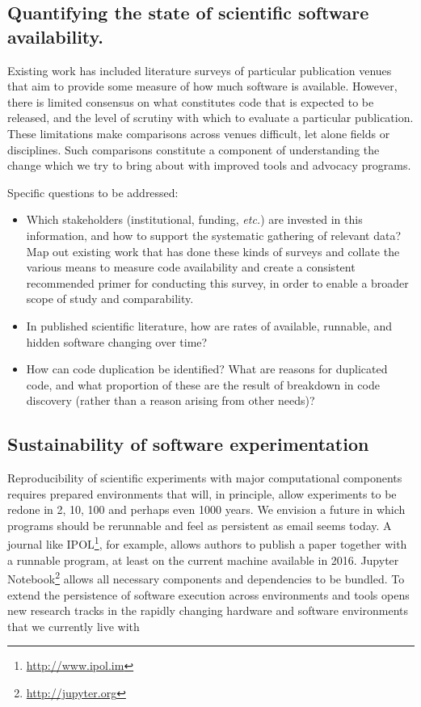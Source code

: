 \documentclass[a4paper,UKenglish]{dagman}
\newcommand{\etc}{\emph{etc.}\xspace}
\begin{document}

\subsection{Quantifying the state of scientific software availability.}

Existing work has included literature surveys of particular publication venues  that aim to provide some measure of how much software is available. However, there is limited consensus on what constitutes code that is expected to be released, and the level of scrutiny with which to evaluate a particular publication. These limitations make comparisons across venues difficult, let alone fields or disciplines. Such comparisons constitute a component of understanding the change which we try to bring about with improved tools and advocacy programs. 

Specific questions to be addressed:
\begin{itemize}
\item Which stakeholders (institutional, funding, \etc) are invested in this information, and how to support the systematic gathering of relevant data? Map out existing work that has done these kinds of surveys and collate the various means to measure code availability and create a consistent recommended primer for conducting this survey, in order to enable a broader scope of study and comparability.
\item In published scientific literature, how are rates of available, runnable, and hidden software changing over time?
\item How can code duplication be identified? What are reasons for duplicated code, and what proportion of these are the result of breakdown in code discovery (rather than a reason arising from other needs)?
\end{itemize}

\subsection{Sustainability of software experimentation}

Reproducibility of scientific experiments with major computational components requires prepared environments that will, in principle, allow experiments to be redone in 2, 10, 100 and perhaps even 1000 years. We envision a future in which programs should be rerunnable and feel as persistent as email seems today. A journal like IPOL\footnote{\url{http://www.ipol.im}}, for example, allows authors to publish a paper together with a runnable program, at least on the current machine available in 2016. Jupyter Notebook\footnote{\url{http://jupyter.org}} allows all necessary components and dependencies to be bundled. To extend the persistence of software execution across environments and tools opens new research tracks in the rapidly changing hardware and software environments that we currently live with
\end{document}
